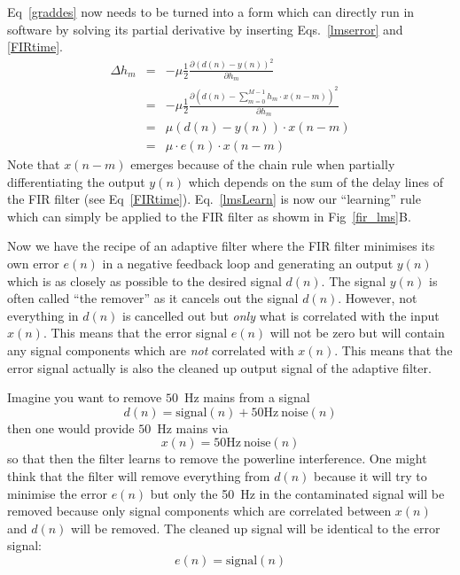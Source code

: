 \documentclass[12pt,a4paper]{article}
\begin{document}
Eq~\ref{graddes} now needs to be turned into a form which can directly run in software by
solving its partial derivative by inserting Eqs.~\ref{lmserror} and \ref{FIRtime}.
\begin{eqnarray}
  \Delta h_m & = & - \mu \frac{1}{2}\frac{\partial \left(d(n)-y(n)\right)^2}{\partial h_m} \\
                & = & - \mu \frac{1}{2}\frac{\partial \left(d(n)-\sum_{m=0}^{M-1} h_m \cdot x(n-m)\right)^2}{\partial h_m} \\
                & = & \mu \left(d(n)-y(n)\right) \cdot x(n-m) \\
                & = & \mu \cdot e(n) \cdot x(n-m) \label{lmsLearn}
\end{eqnarray}
Note that $x(n-m)$ emerges because
of the chain rule when partially differentiating the output
$y(n)$ which depends on the sum of the delay lines of the FIR
filter (see Eq~\ref{FIRtime}). Eq.~\ref{lmsLearn} is now our ``learning''
rule which can simply be applied to the FIR filter as showm in Fig~\ref{fir_lms}B.

Now we have the recipe of an adaptive filter where the FIR filter minimises its
own error $e(n)$ in a negative feedback loop and generating an output
$y(n)$ which is as closely as possible to the desired signal $d(n)$. The signal
$y(n)$ is often called ``the remover'' as it cancels out the signal $d(n)$.
However, not everything in $d(n)$ is cancelled out but \textsl{only} what
is correlated with the input $x(n)$. This means that the error signal
$e(n)$ will not be zero but will contain any signal components which are
\textsl{not} correlated with $x(n)$. This means that the error signal actually
is also the cleaned up output signal of the adaptive filter.

Imagine you want to remove $50$~Hz mains from a signal
\begin{equation}
d(n) = \mathrm{signal}(n) + \mathrm{50Hz~noise}(n)
\end{equation}
then one would provide $50$~Hz mains
via
\begin{equation}
  x(n) = \mathrm{50Hz~noise}(n)
\end{equation}  
so that then the filter learns to remove the powerline
interference. One might think that the filter will remove everything from
$d(n)$ because it will try to minimise the error $e(n)$ but only the
50~Hz in the contaminated signal will be removed because only signal components
which are correlated between $x(n)$ and $d(n)$ will be removed.
The cleaned up signal will be identical to the error
signal:
\begin{equation}
  e(n) = \mathrm{signal}(n)
\end{equation}
\end{document}
